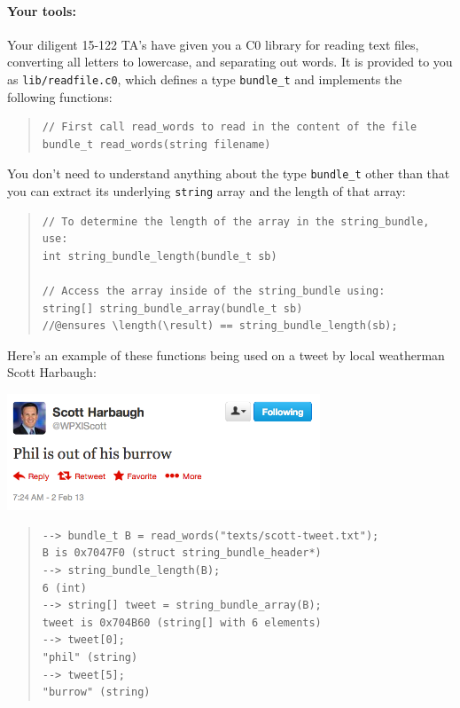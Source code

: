 \documentclass[12pt]{exam}
\begin{document}
\paragraph{Your tools:} %
Your diligent 15-122 TA's have given you a C0 library for reading text
files, converting all letters to lowercase, and separating out
words. It is provided to you as \lstinline'lib/readfile.c0', which
defines a type \lstinline'bundle_t' and implements the following
functions:

\begin{quote}
\begin{lstlisting}[basicstyle=\smallbasicstyle]
// First call read_words to read in the content of the file
bundle_t read_words(string filename)
\end{lstlisting}
\end{quote}
You don't need to understand anything about the type
\lstinline'bundle_t' other than that you can extract its underlying
\lstinline'string' array and the length of that array:
\begin{quote}
\begin{lstlisting}[basicstyle=\smallbasicstyle]
// To determine the length of the array in the string_bundle, use:
int string_bundle_length(bundle_t sb)

// Access the array inside of the string_bundle using:
string[] string_bundle_array(bundle_t sb)
//@ensures \length(\result) == string_bundle_length(sb);
\end{lstlisting}
\end{quote}

\noindent
Here's an example of these functions being used on a tweet by local
weatherman Scott Harbaugh:

\begin{center}
\includegraphics[width=0.7\textwidth]{img/wpxiscott.png}
\end{center}


\begin{quote}
\begin{lstlisting}[language={[coin]C}, basicstyle=\smallbasicstyle]
% coin -d lib/readfile.c0
--> bundle_t B = read_words("texts/scott-tweet.txt");
B is 0x7047F0 (struct string_bundle_header*)
--> string_bundle_length(B);
6 (int)
--> string[] tweet = string_bundle_array(B);
tweet is 0x704B60 (string[] with 6 elements)
--> tweet[0];
"phil" (string)
--> tweet[5];
"burrow" (string)
\end{lstlisting}
\end{quote}
\end{document}
